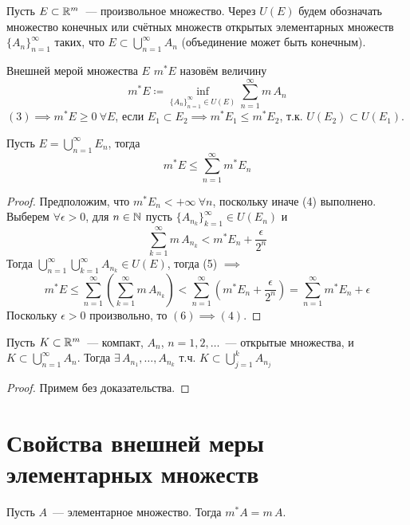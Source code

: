 \documentclass[main]{subfiles}
\begin{document}
\begin{definition}
    Пусть $E\subset\mathbb{R}^m$~--- произвольное множество.
    Через $U(E)$ будем обозначать множество конечных или счётных множеств открытых элементарных множеств $\{A_n\}^\infty_{n=1}$ таких, что $E\subset\bigcup_{n=1}^{\infty} A_n$ (объединение может быть конечным).
\end{definition}

\begin{definition}
    Внешней мерой множества $E$ $m^*E$ назовём величину
    \[ m^*E \coloneq \inf_{\{A_n\}^\infty_{n=1}\in U(E)} \sum_{n=1}^{\infty} m\,A_n\tag{3} \]
    $(3) \implies m^*E\ge 0\ \forall E$, если $E_1\subset E_2\implies m^*E_1\le m^*E_2$, т.к. $U(E_2)\subset U(E_1)$.
\end{definition}

\begin{theorem}
    Пусть $E=\bigcup_{n=1}^{\infty} E_n$, тогда \[m^*E\le\sum_{n=1}^{\infty} m^*E_n\tag{4}\]
\end{theorem}

\begin{proof}
    Предположим, что $m^*E_n<+\infty\ \forall n$, поскольку иначе (4) выполнено.
    Выберем $\forall\epsilon>0$, для $n\in\mathbb{N}$ пусть $\{A_{n_k}\}^\infty_{k=1}\in U(E_n)$ и
    \[ \sum_{k=1}^{\infty} m\,A_{n_k}< m^*E_n+\frac{\epsilon}{2^n}\tag{5} \]
    Тогда $\bigcup_{n=1}^{\infty} \bigcup_{k=1}^\infty A_{n_k}\in U(E)$, тогда (5) $\implies$
    \[ m^*E\le\sum_{n=1}^{\infty} \left( \sum_{k=1}^{\infty} m\,A_{n_k} \right) < \sum_{n=1}^{\infty} \left(m^*E_n+\frac{\epsilon}{2^n}\right) = \sum_{n=1}^{\infty} m^*E_n+\epsilon\tag{6} \]
    Поскольку $\epsilon>0$ произвольно, то $(6)\implies (4)$.
\end{proof}

\begin{lemma}[Бореля]
    Пусть $K\subset\mathbb{R}^m$~--- компакт, $A_n$, $n=1, 2, \dots$~--- открытые множества, и $K\subset\bigcup_{n=1}^{\infty} A_n$.
    Тогда $\exists\,A_{n_1}, \dots,A_{n_k}$ т.ч. $K\subset \bigcup_{j=1}^k A_{n_j}$
\end{lemma}

\begin{proof}
    Примем без доказательства.
\end{proof}

\section{Свойства внешней меры элементарных множеств}
\begin{theorem}
    Пусть $A$~--- элементарное множество.
    Тогда $m^*A=m\,A$.
\end{theorem}
\end{document}
